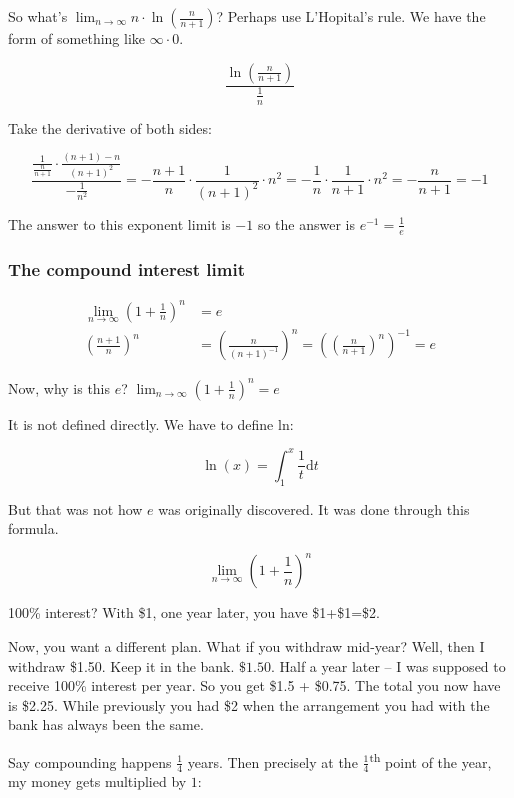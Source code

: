 \documentclass[12pt]{article}
\theoremstyle{plain}
\theoremstyle{remark}
\theoremstyle{definition}
\begin{document}
So what's
\(\lim_{n \rightarrow \infty}{n \cdot \ln\left( \frac{n}{n + 1} \right)}\)?
Perhaps use L'Hopital's rule. We have the form of something like
\(\infty \cdot 0\).

\[\frac{\ln\left( \frac{n}{n + 1} \right)}{\frac{1}{n}}\]

Take the derivative of both sides:

\[\frac{\frac{1}{\frac{n}{n + 1}} \cdot \frac{(n + 1) - n}{(n + 1)^{2}}}{- \frac{1}{n^{2}}} = - \frac{n + 1}{n} \cdot \frac{1}{(n + 1)^{2}} \cdot n^{2} = - \frac{1}{n} \cdot \frac{1}{n + 1} \cdot n^{2} = - \frac{n}{n + 1} = - 1\]

The answer to this exponent limit is \(- 1\) so the answer is
\(e^{- 1} = \frac{1}{e}\)


\subsubsection{The compound interest
limit}

\begin{align*}
\lim_{n \rightarrow \infty}\left( 1 + \frac{1}{n} \right)^{n} &= e \\
\left( \frac{n + 1}{n} \right)^{n} &= \left( \frac{n}{(n + 1)^{- 1}} \right)^{n} = \left( \left( \frac{n}{n + 1} \right)^{n} \right)^{- 1} = e
\end{align*}


Now, why is this \(e\)?
\(\lim_{n \rightarrow \infty}\left( 1 + \frac{1}{n} \right)^{n} = e\)

It is not defined directly. We have to define ln:

\[\ln(x) = \int_{1}^{x}{\frac{1}{t}\text{d}t}\]

But that was not how \(e\) was originally discovered. It was done
through this formula.

\[\lim_{n \rightarrow \infty}\left( 1 + \frac{1}{n} \right)^{n}\]

100\% interest? With \$1, one year later, you have \$1+\$1=\$2.

Now, you want a different plan. What if you withdraw mid-year? Well,
then I withdraw \$1.50. Keep it in the bank. \(\$ 1.50\). Half a year
later -- I was supposed to receive 100\% interest per year. So you get
\$1.5 + \$0.75. The total you now have is \$2.25. While previously you
had \$2 when the arrangement you had with the bank has always been the
same.

Say compounding happens \(\frac{1}{4}\) years. Then precisely at the
\(\frac{1}{4}\)\textsuperscript{th} point of the year, my money gets
multiplied by \(1\):
\end{document}
